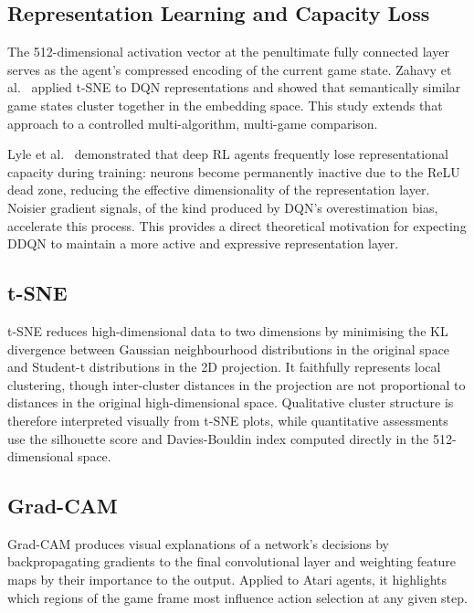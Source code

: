 \documentclass[a4paper]{article}
\begin{document}
\subsection{Representation Learning and Capacity Loss}

The 512-dimensional activation vector at the penultimate fully connected layer serves as the agent's compressed encoding of the current game state. Zahavy et al.\ \cite{zahavy2016graying} applied t-SNE to DQN representations and showed that semantically similar game states cluster together in the embedding space. This study extends that approach to a controlled multi-algorithm, multi-game comparison.

Lyle et al.\ \cite{lyle2022understanding} demonstrated that deep RL agents frequently lose representational capacity during training: neurons become permanently inactive due to the ReLU dead zone, reducing the effective dimensionality of the representation layer. Noisier gradient signals, of the kind produced by DQN's overestimation bias, accelerate this process. This provides a direct theoretical motivation for expecting DDQN to maintain a more active and expressive representation layer.

\subsection{t-SNE}

t-SNE \cite{van2008visualizing} reduces high-dimensional data to two dimensions by minimising the KL divergence between Gaussian neighbourhood distributions in the original space and Student-t distributions in the 2D projection. It faithfully represents local clustering, though inter-cluster distances in the projection are not proportional to distances in the original high-dimensional space. Qualitative cluster structure is therefore interpreted visually from t-SNE plots, while quantitative assessments use the silhouette score and Davies-Bouldin index computed directly in the 512-dimensional space.

\subsection{Grad-CAM}

Grad-CAM \cite{selvaraju2017grad} produces visual explanations of a network's decisions by backpropagating gradients to the final convolutional layer and weighting feature maps by their importance to the output. Applied to Atari agents, it highlights which regions of the game frame most influence action selection at any given step.
\end{document}
